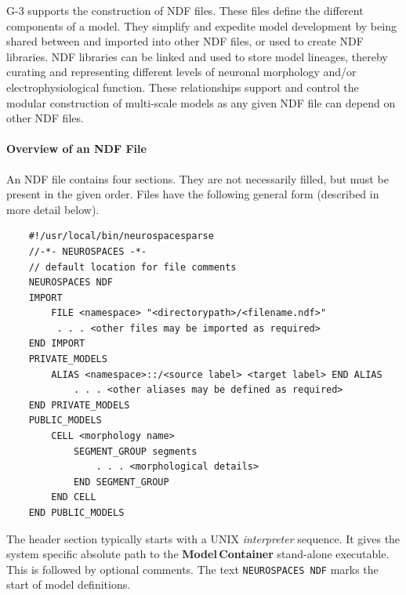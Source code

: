 \documentclass{article}
\begin{document}
G-3 supports the construction of NDF files. These files define the different components of a model.  They simplify and expedite model development by being shared between and imported into other NDF files, or used to create NDF libraries. NDF libraries can be linked and used to store model lineages, thereby curating and representing different
levels of neuronal morphology and/or electrophysiological function.
These relationships support and control the modular construction of multi-scale
models as any given NDF file can depend on other NDF files.

\paragraph{Overview of an NDF File}
\label{sec:overview-ndf-file}
An NDF file contains four sections. They are not necessarily
filled, but must be present in the given order.  Files have
the following general form (described in more detail below).

\begin{center}
\begin{verbatim}
    #!/usr/local/bin/neurospacesparse
    //-*- NEUROSPACES -*-
    // default location for file comments
    NEUROSPACES NDF
    IMPORT
        FILE <namespace> "<directorypath>/<filename.ndf>"
         . . . <other files may be imported as required>
    END IMPORT
    PRIVATE_MODELS
        ALIAS <namespace>::/<source label> <target label> END ALIAS
            . . . <other aliases may be defined as required>
    END PRIVATE_MODELS
    PUBLIC_MODELS
        CELL <morphology name>
            SEGMENT_GROUP segments
                . . . <morphological details>
            END SEGMENT_GROUP
        END CELL
    END PUBLIC_MODELS
\end{verbatim}
\end{center}

The header section
typically starts with a UNIX {\it interpreter} sequence. It
gives the system specific absolute path to the {\bf Model\,Container} stand-alone executable.
This is followed by optional comments.  The text {\tt NEUROSPACES NDF} marks the start of model definitions.
\end{document}
